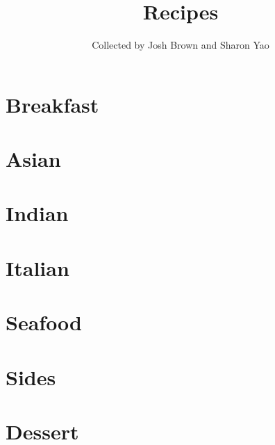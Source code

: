 \documentclass[oneside,10pt]{book}
\title{\bf \Huge Recipes}
\author{Collected by Josh Brown and Sharon Yao}
\date{}
\begin{document}
\maketitle
\tableofcontents{}

\chapter{Breakfast}
    
    
    
    
    

\chapter{Asian}
    
    

\chapter{Indian}
    
    
    

\chapter{Italian}
    

\chapter{Seafood}
    
    
    
    
    
    

\chapter{Sides}
    
    

\chapter{Dessert}
    
    
    
    
    
    
\end{document}
